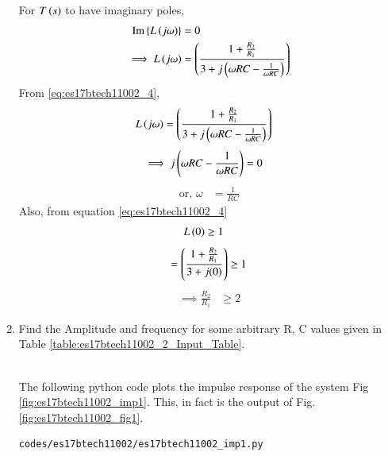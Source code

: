 \begin{enumerate}[label=\arabic*.,ref=\theenumi]
For $T\left(s\right)$ to have imaginary poles, 
\begin{align}
\text{Im}\left\{L\left(j \omega\right)\right\} &= 0
\\
\implies L\left(j\omega\right)&= \left(\frac{1+\frac{R_{2}}{R_{1}}}{3+ j \left(\omega RC-\frac{1}{\omega RC}\right)}\right)
\end{align}
From \eqref{eq:es17btech11002_4},
\begin{align}
 L\left(j\omega\right) &=\left(\frac{1+\frac{R_{2}}{R_{1}}}{3+j \left(\omega RC-\frac{1}{\omega RC}\right)}\right)
\end{align} 
\begin{align}
\implies j\left(\omega RC - \frac{1}{\omega RC}\right) &= 0
\end{align}
\begin{align}
\text{or, } \omega &= \frac{1}{RC}
\label{eq:es17btech11002_freq}
\end{align}
Also, from equation \eqref{eq:es17btech11002_4}
\begin{align}
L\left(0\right) &\ge 1
\end{align}
\begin{align}
= \left(\frac{1+\frac{R_{2}}{R_{1}}}{3+j(0)}\right) \geq 1
\end{align}
\begin{align}
\implies \frac{R_{2}}{R_{1}} &\geq 2
\end{align}
\item Find the Amplitude and frequency for some arbitrary R, C values given in Table \ref{table:es17btech11002_2_Input_Table}.\\
\begin{table}[!ht]
\centering

\caption{}
\label{table:es17btech11002_2_Input_Table}
\end{table}
\renewcommand{\thefigure}{\theenumi.\arabic{figure}}
\\
\solution The following python code plots the impulse response of the system Fig \ref{fig:es17btech11002_imp1}. This, in fact is the output of Fig. \ref{fig:es17btech11002_fig1}.
\begin{lstlisting}
codes/es17btech11002/es17btech11002_imp1.py
\end{lstlisting}
\begin{figure}[!ht]
\centering

\end{figure}
\end{enumerate}
